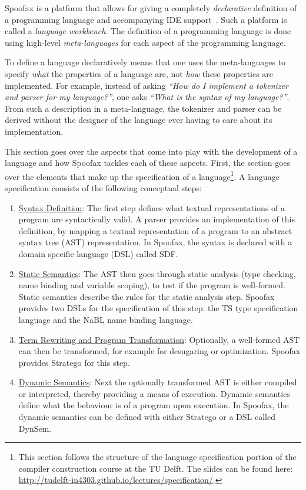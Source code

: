 Spoofax is a platform that allows for giving a completely
\emph{declarative} definition of a programming language and accompanying
IDE support~\cite{Kats10a}. Such a platform is called a \emph{language
workbench}. The definition of a programming language is done using
high-level \emph{meta-languages} for each aspect of the programming
language.

To define a language declaratively means that one uses the
meta-languages to specify \emph{what} the properties of a language are, not
\emph{how} these properties are implemented. For example, instead of asking
\emph{​``How do I implement a tokenizer and parser for my language?''​}, one
asks \emph{​``What is the syntax of my language?''​}. From such a description
in a meta-language, the tokenizer and parser can be derived without
the designer of the language ever having to care about its
implementation.

This section goes over the aspects that come into play with the
development of a language and how Spoofax tackles each of these
aspects. First, the section goes over the elements that make up the
specification of a language\footnote{This section follows
the structure of the language specification portion of the compiler
construction course at the TU Delft. The slides can be found here:
\url{http://tudelft-in4303.github.io/lectures/specification/}.}. A language
specification consists of the following conceptual steps:

\begin{enumerate}
\item \hyperref[sec:syntax-def]{Syntax Definition}: The first step defines what textual
representations of a program are syntactically valid. A parser
provides an implementation of this definition, by mapping a textual
representation of a program to an abstract syntax tree (AST)
representation. In Spoofax, the syntax is declared with a domain
specific language (DSL) called SDF.
\item \hyperref[sec:static-analysis]{Static Semantics}: The AST then goes through static analysis (type
checking, name binding and variable scoping), to test if the
program is well-formed. Static semantics describe the rules for the
static analysis step. Spoofax provides two DSLs for the
specification of this step: the TS type specification language and
the NaBL name binding language.
\item \hyperref[sec:term-rewrite]{Term Rewriting and Program Transformation}: Optionally, a
well-formed AST can then be transformed, for example for desugaring
or optimization. Spoofax provides Stratego for this step.
\item \hyperref[sec:dynamic-semantics]{Dynamic Semantics}: Next the optionally transformed AST is either
compiled or interpreted, thereby providing a means of
execution. Dynamic semantics define what the behaviour is of a
program upon execution. In Spoofax, the dynamic semantics can be
defined with either Stratego or a DSL called DynSem.
\end{enumerate}

